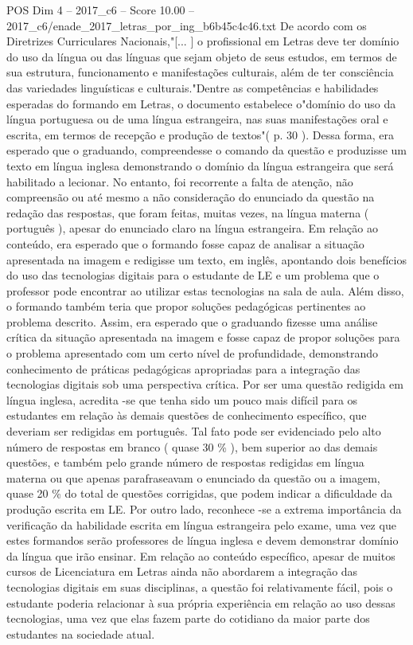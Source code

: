 \begin{textsample}{POS Dim 4 – 2017\_c6 – Score 10.00 – 2017\_c6/enade\_2017\_letras\_por\_ing\_b6b45c4c46.txt}
De acordo com os Diretrizes Curriculares Nacionais,"[... ] o profissional em Letras deve ter domínio do uso da língua ou das línguas que sejam objeto de seus estudos, em termos de sua estrutura, funcionamento e manifestações culturais, além de ter consciência das variedades linguísticas e culturais."Dentre as competências e habilidades esperadas do formando em Letras, o documento estabelece o"domínio do uso da língua portuguesa ou de uma língua estrangeira, nas suas manifestações oral e escrita, em termos de recepção e produção de textos"( p. 30 ).
Dessa forma, era esperado que o graduando, compreendesse o comando da questão e produzisse um texto em língua inglesa demonstrando o domínio da língua estrangeira que será habilitado a lecionar.
No entanto, foi recorrente a falta de atenção, não compreensão ou até mesmo a não consideração do enunciado da questão na redação das respostas, que foram feitas, muitas vezes, na língua materna ( português ), apesar do enunciado claro na língua estrangeira.
Em relação ao conteúdo, era esperado que o formando fosse capaz de analisar a situação apresentada na imagem e redigisse um texto, em inglês, apontando dois benefícios do uso das tecnologias digitais para o estudante de LE e um problema que o professor pode encontrar ao utilizar estas tecnologias na sala de aula.
Além disso, o formando também teria que propor soluções pedagógicas pertinentes ao problema descrito.
Assim, era esperado que o graduando fizesse uma análise crítica da situação apresentada na imagem e fosse capaz de propor soluções para o problema apresentado com um certo nível de profundidade, demonstrando conhecimento de práticas pedagógicas apropriadas para a integração das tecnologias digitais sob uma perspectiva crítica.
Por ser uma questão redigida em língua inglesa, acredita -se que tenha sido um pouco mais difícil para os estudantes em relação às demais questões de conhecimento específico, que deveriam ser redigidas em português.
Tal fato pode ser evidenciado pelo alto número de respostas em branco ( quase 30 \% ), bem superior ao das demais questões, e também pelo grande número de respostas redigidas em língua materna ou que apenas parafraseavam o enunciado da questão ou a imagem, quase 20 \% do total de questões corrigidas, que podem indicar a dificuldade da produção escrita em LE.
Por outro lado, reconhece -se a extrema importância da verificação da habilidade escrita em língua estrangeira pelo exame, uma vez que estes formandos serão professores de língua inglesa e devem demonstrar domínio da língua que irão ensinar.
Em relação ao conteúdo específico, apesar de muitos cursos de Licenciatura em Letras ainda não abordarem a integração das tecnologias digitais em suas disciplinas, a questão foi relativamente fácil, pois o estudante poderia relacionar à sua própria experiência em relação ao uso dessas tecnologias, uma vez que elas fazem parte do cotidiano da maior parte dos estudantes na sociedade atual.

\end{textsample}
